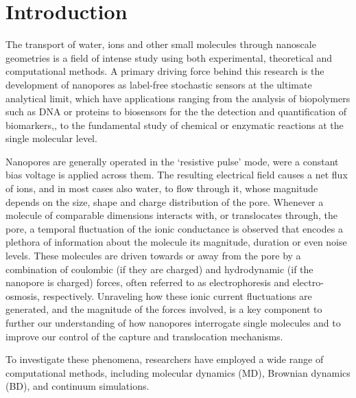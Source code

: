 \documentclass[journal=ancac3,manuscript=article,etalmode=truncate,maxauthors=0,layout=twocolumn]{achemso}
\begin{document}
\section{Introduction}

The transport of water, ions and other small molecules through nanoscale geometries is a field of intense
study using both experimental, theoretical and computational methods.\cite{Sparreboom-2010,Bocquet-2010,
Maffeo-2012,Thomas-2014,Wang-2014,Kim-2015} A primary driving force behind this research is the development
of nanopores as label-free stochastic sensors at the ultimate analytical limit,\cite{Bayley-2001,Dekker-2007,
Venkatesan-2011,Zhang-2016} which have applications ranging from the analysis of biopolymers such as
DNA\cite{Deamer-2016} or proteins\cite{Restrepo-Perez-2018} to biosensors for the the detection and
quantification of biomarkers,\cite{Soskine-2012,VanMeervelt-2014,Huang-2017,Chen-2013}, to the fundamental
study of chemical or enzymatic reactions at the single molecular level.\cite{Willems-VanMeervelt-2017,
Laszlo-2017}

Nanopores are generally operated in the `resistive pulse' mode, were a constant bias voltage is applied across
them. The resulting electrical field causes a net flux of ions, and in most cases also water, to flow
through it, whose magnitude depends on the size, shape and charge distribution of the pore. Whenever a
molecule of comparable dimensions interacts with, or translocates through, the pore, a temporal fluctuation
of the ionic conductance is observed that encodes a plethora of information about the molecule its magnitude,
duration or even noise levels. These molecules are driven towards or away from the pore by a combination of
coulombic (if they are charged) and hydrodynamic (if the nanopore is charged) forces, often referred to as
electrophoresis and electro-osmosis, respectively. Unraveling how these ionic current fluctuations are
generated, and the magnitude of the forces involved, is a key component to further our understanding of how
nanopores interrogate single molecules and to improve our control of the capture and translocation mechanisms.

To investigate these phenomena, researchers have employed a wide range of computational methods, including
molecular dynamics (MD), Brownian dynamics (BD), and continuum simulations.

\end{document}
